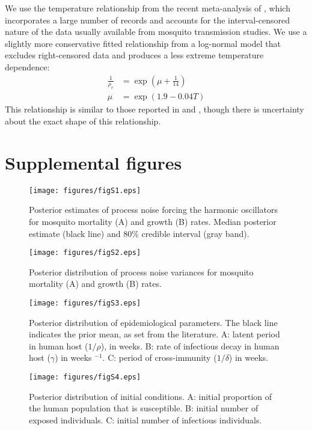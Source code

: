 \documentclass[12pt,letterpaper]{article}
\begin{document}
\begin{itemize}
We use the temperature relationship from the recent meta-analysis of \cite{Chan2012}, which incorporates a large number of records and accounts for the interval-censored nature of the data usually available from mosquito transmission studies.
We use a slightly more conservative fitted relationship from a log-normal model that excludes right-censored data and produces a less extreme temperature dependence:
\begin{align}
\frac{1}{\rho_v} &= \exp \left(\mu + \frac{1}{14}\right)\\
\mu & = \exp(1.9 - 0.04 T)
\end{align}
This relationship is similar to those reported in \cite{Focks1995} and \cite{Tjaden2013}, though there is uncertainty about the exact shape of this relationship.
\end{itemize}




\newpage

\section*{Supplemental figures}

\begin{figure}[!h]
\texttt{[image: figures/figS1.eps]}
\caption{
Posterior estimates of process noise forcing the harmonic oscillators for mosquito mortality (A) and growth (B) rates.  Median posterior estimate (black line) and 80\% credible interval (gray band).
}
\end{figure}

\begin{figure}[!h]
\texttt{[image: figures/figS2.eps]}
\caption{
Posterior distribution of process noise variances for mosquito mortality (A) and growth (B) rates.
}
\end{figure}

\begin{figure}[!h]
\texttt{[image: figures/figS3.eps]}
\caption{
Posterior distribution of epidemiological parameters.  The black line indicates the prior mean, as set from the literature.  A: latent period in human host ($1/\rho$), in weeks. B: rate of infectious decay in human host ($\gamma$) in weeks $^{-1}$. C: period of cross-immunity ($1/\delta$) in weeks.
}
\end{figure}

\begin{figure}[!h]
\texttt{[image: figures/figS4.eps]}
\caption{Posterior distribution of initial conditions. A: initial proportion of the human population that is susceptible. B: initial number of exposed individuals. C: initial number of infectious individuals.
}
\end{figure}
\end{document}
